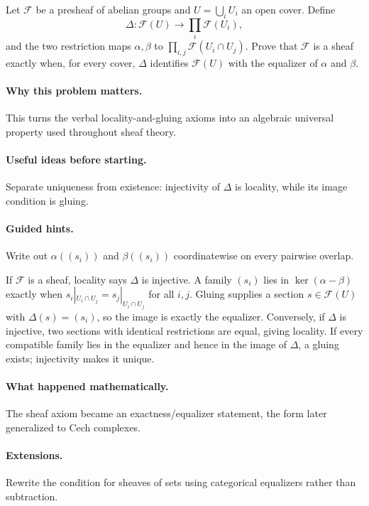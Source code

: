 \begin{problem}
Let $\mathcal F$ be a presheaf of abelian groups and $U=\bigcup_iU_i$ an open cover. Define
\[
\Delta:\mathcal F(U)\to\prod_i\mathcal F(U_i),
\]
and the two restriction maps $\alpha,\beta$ to $\prod_{i,j}\mathcal F(U_i\cap U_j)$. Prove that $\mathcal F$ is a sheaf exactly when, for every cover, $\Delta$ identifies $\mathcal F(U)$ with the equalizer of $\alpha$ and $\beta$.
\end{problem}

\paragraph{Why this problem matters.}
This turns the verbal locality-and-gluing axioms into an algebraic universal property used throughout sheaf theory.

\paragraph{Useful ideas before starting.}
Separate uniqueness from existence: injectivity of $\Delta$ is locality, while its image condition is gluing.

\paragraph{Guided hints.}
Write out $\alpha((s_i))$ and $\beta((s_i))$ coordinatewise on every pairwise overlap.

\ifdefined\FullProblemDossiers
\begin{solution}
If $\mathcal F$ is a sheaf, locality says $\Delta$ is injective. A family $(s_i)$ lies in $\ker(\alpha-\beta)$ exactly when $s_i|_{U_i\cap U_j}=s_j|_{U_i\cap U_j}$ for all $i,j$. Gluing supplies a section $s\in\mathcal F(U)$ with $\Delta(s)=(s_i)$, so the image is exactly the equalizer. Conversely, if $\Delta$ is injective, two sections with identical restrictions are equal, giving locality. If every compatible family lies in the equalizer and hence in the image of $\Delta$, a gluing exists; injectivity makes it unique.
\end{solution}

\paragraph{What happened mathematically.}
The sheaf axiom became an exactness/equalizer statement, the form later generalized to Cech complexes.

\paragraph{Extensions.}
Rewrite the condition for sheaves of sets using categorical equalizers rather than subtraction.
\fi
